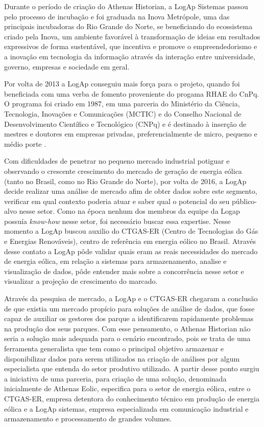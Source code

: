 Durante o período de criação do Athenas Historian, a LogAp Sistemas passou pelo processo de incubação e foi graduada na Inova Metrópole, uma das principais incubadoras do Rio Grande do Norte, se beneficiando do ecossistema criado pela Inova, um ambiente favorável à transformação de ideias em resultados expressivos de forma sustentável, que incentiva e promove o empreendedorismo e a inovação em tecnologia da informação através da interação entre universidade, governo, empresas e sociedade em geral.

Por volta de 2013 a LogAp conseguiu mais força para o projeto, quando foi beneficiada com uma verba de fomento proveniente do progama RHAE do CnPq. O programa foi criado em 1987, em uma parceria do Ministério da Ciência, Tecnologia, Inovações e Comunicações (MCTIC) e do Conselho Nacional de Desenvolvimento Científico e Tecnológico (CNPq) e é destinado à inserção de mestres e doutores em empresas privadas, preferencialmente de micro, pequeno e médio porte \cite{RHAE}.

Com dificuldades de penetrar no pequeno mercado industrial potiguar e observando o crescente crescimento do mercado de geração de energia eólica (tanto no Brasil, como no Rio Grande do Norte), por volta de 2016, a LogAp decide realizar uma análise de mercado afim de obter dados sobre este segmento, verificar em qual contexto poderia atuar e saber qual o potencial do seu público-alvo nesse setor. Como na época nenhum dos membros da equipe da Logap possuía \textit{know-how} nesse setor, foi necessário buscar essa expertise. Nesse momento a LogAp buscou auxilio do CTGAS-ER (Centro de Tecnologias do Gás e Energias Renováveis), centro de referência em energia eólico no Brasil. Através desse contato a LogAp pôde validar quais eram as reais necessidades do mercado de energia eólica, em relação a sistemas para armazenamento, analise e visualização de dados, pôde entender mais sobre a concorrência nesse setor e visualizar a projeção de crescimento do marcado.

Através da pesquisa de mercado, a LogAp e o CTGAS-ER chegaram a conclusão de que existia um mercado propício para soluções de análise de dados, que fosse capaz de auxiliar os gestores dos parque a identificarem rapidamente problemas na produção dos seus parques. Com esse pensamento, o Athenas Historian não seria a solução mais adequada para o cenário encontrado, pois se trata de uma ferramenta generalista que tem como o principal objetivo armazenar e disponibilizar dados para serem utilizados na criação de análises por algum especialista que entenda do setor produtivo utilizado. A partir desse ponto surgiu a iniciativa de uma parceria, para criação de uma solução, denominada inicialmente de Athenas Eolic, especifica para o setor de energia eólica, entre o CTGAS-ER, empresa detentora do conhecimento técnico em produção de energia eólica e a LogAp sistemas, empresa especializada em comunicação industrial e armazenamento e processamento de grandes volumes.

